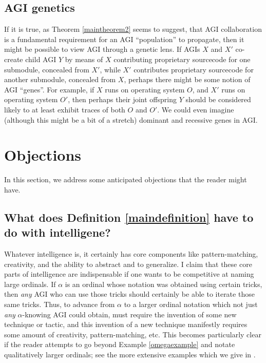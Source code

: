 \documentclass[runningheads]{llncs}
\begin{document}
\subsection{AGI genetics}

If it is true, as Theorem \ref{maintheorem2} seems to suggest, that AGI collaboration
is a fundamental requirement for an AGI ``population'' to propagate, then it might
be possible to view AGI through a genetic lens. If AGIs $X$ and $X'$ co-create child AGI $Y$ by
means of $X$ contributing proprietary sourcecode for one submodule, concealed from $X'$,
while $X'$ contributes proprietary sourcecode for another submodule, concealed from $X$,
perhaps there might be some notion of AGI ``genes''. For example, if $X$ runs on operating
system $O$, and $X'$ runs on operating system $O'$, then perhaps their joint offspring
$Y$ should be considered likely to at least exhibit traces of both $O$ and $O'$.
We could even imagine (although this might be a bit of a stretch) dominant and recessive
genes in AGI.


\section{Objections}
\label{objectionsection}

In this section, we address some anticipated objections that the reader might have.

\subsection{What does Definition \ref{maindefinition} have to do with intelligene?}

Whatever intelligence is, it certainly has core components like pattern-matching,
creativity, and the ability to abstract and to generalize.
I claim that these core parts of intelligence are indispensable if one wants to
be competitive at naming large ordinals. If $\alpha$ is an ordinal whose
notation was obtained using certain tricks, then \emph{any} AGI who can use those
tricks should certainly be able to iterate those same tricks. Thus, to advance from
$\alpha$ to a larger ordinal notation which not just \emph{any} $\alpha$-knowing
AGI could obtain, must require the invention of some new technique or tactic, and
this invention of a new technique manifestly requires some amount of creativity,
pattern-matching, etc. This becomes particularly clear if the reader attempts to
go beyond Example \ref{omegaexample} and notate qualitatively larger ordinals;
see the more extensive examples which we give in \cite{alexander2019measuring}.
\end{document}
